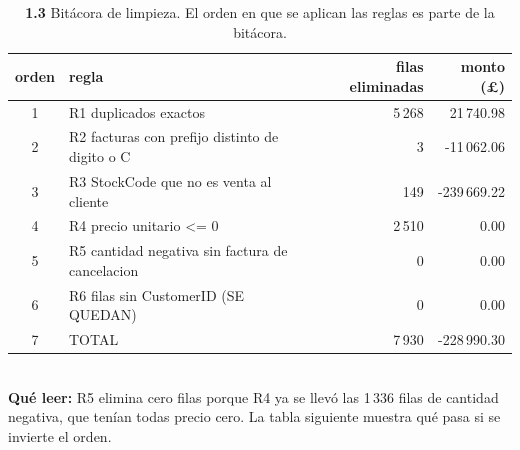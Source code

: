 \begin{table}[htbp]
\centering
\footnotesize
\caption{\textbf{1.3} Bit\'acora de limpieza. El orden en que se aplican las reglas es parte de la bit\'acora.}
\label{tab:p1_bitacora}
\begin{tabular}{clrr}
\toprule
\textbf{orden} & \textbf{regla} & \textbf{filas eliminadas} & \textbf{monto (\pounds)} \\
\midrule
1 & R1 duplicados exactos & 5\,268 & 21\,740.98 \\
2 & R2 facturas con prefijo distinto de digito o C & 3 & -11\,062.06 \\
3 & R3 StockCode que no es venta al cliente & 149 & -239\,669.22 \\
4 & R4 precio unitario <= 0 & 2\,510 & 0.00 \\
5 & R5 cantidad negativa sin factura de cancelacion & 0 & 0.00 \\
6 & R6 filas sin CustomerID (SE QUEDAN) & 0 & 0.00 \\
7 & TOTAL & 7\,930 & -228\,990.30 \\
\bottomrule
\end{tabular}
\\[0.3em]{\scriptsize \textbf{Qu\'e leer:} R5 elimina cero filas porque R4 ya se llev\'o las 1\,336 filas de cantidad negativa, que ten\'ian todas precio cero. La tabla siguiente muestra qu\'e pasa si se invierte el orden.}
\end{table}
